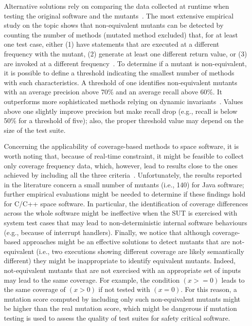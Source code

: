 Alternative solutions rely on comparing the data collected at runtime when testing the original software and the mutants~\cite{grun2009impact,schuler2010covering,schuler2013covering}.
The most extensive empirical study on the topic shows that non-equivalent mutants can be detected by counting the number of methods (mutated method excluded) that, for at least one test case, either (1) have statements that are executed at a different frequency with the mutant, (2) generate at least one different return value, or (3) are invoked at a different frequency~\cite{schuler2013covering}. To determine if a mutant is non-equivalent, it is possible to define a threshold indicating the smallest number of methods with such characteristics. A threshold of one identifies non-equivalent mutants with an average precision above 70\% and an average recall above 60\%. It outperforms more sophisticated methods relying on dynamic invariants~\cite{schuler2009efficient}.
Values above one slightly improve precision but make recall drop (e.g., recall is below 50\% for a threshold of five); also, the proper threshold value may depend on the size of the test suite. 

Concerning the applicability of coverage-based methods to space software, it is worth noting that, because of real-time constraint, it might be feasible to collect only coverage frequency data, which, however, lead to results close to the ones achieved by including all the three criteria~\cite{schuler2013covering}.
Unfortunately, the  results reported in the literature concern a small number of mutants (i.e., 140) for Java software; further empirical evaluations might be needed to determine if these findings hold for C/C++ space software. 
In particular, the identification of coverage differences across the whole software might be ineffective when the SUT is exercised with system test cases that may lead to non-deterministic internal software behaviours (e.g., because of interrupt handlers). Finally, we notice that although coverage-based approaches might be an effective solutions to detect mutants that are not-equivalent (i.e., two executions showing different coverage are likely semantically different) they might be inappropriate to identify equivalent mutants. Indeed, not-equivalent mutants that are not exercised with an appropriate set of inputs may lead to the same coverage. For example, the condition $(x >= 0)$ leads to the same coverage of $(x > 0)$ if not tested with $(x=0)$. For this reason, a mutation score computed by including only such non-equivalent mutants might be higher than the real mutation score, which might be dangerous if mutation testing is used to assess the quality of test suites for safety critical software.

